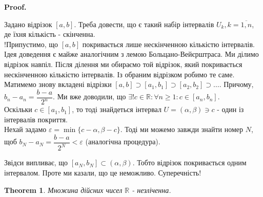 \documentclass[a4paper, 14pt]{article}
\makeatletter
\def\qed{$\blacksquare$}
\theoremstyle{theoremdd}
\newtheorem{theorem}{Theorem}[subsection]
\theoremstyle{theoremdd}
\theoremstyle{theoremdd}
\theoremstyle{theoremdd}
\theoremstyle{theoremdd}
\theoremstyle{theoremdd}
\theoremstyle{theoremdd}
\theoremstyle{theoremdd}
\renewenvironment{proof}[1][Proof.\\]{\par
\pushQED{\hfill \qed}%
\normalfont \topsep6\p@\@plus6\p@\relax
\trivlist
\item\relax
{\bfseries
#1\@addpunct{.}}\hspace\labelsep\ignorespaces
}{%
\popQED\endtrivlist\@endpefalse
}
\makeatother
\begin{document}
	\begin{proof}
	Задано відрізок $[a,b]$. Треба довести, що є такий набір інтервалів $U_k, k = \overline{1,n}$, де їхня кількість - скінченна.\\
	!Припустимо, що $[a,b]$ покривається лише нескінченною кількістю інтервалів. \\ 
	Ідея доведення є майже аналогічним з лемою Больцано-Вейєрштраса. Ми ділимо відрізок навпіл. Після ділення ми обираємо той відрізок, який покривається нескінченною кількістю інтервалів. Із обраним відрізком робимо те саме.\\
	Матимемо знову вкладені відрізки $[a,b] \supset [a_1,b_1] \supset [a_2,b_2] \supset \dots$. Причому, $b_n - a_n = \dfrac{b-a}{2^n}$. Ми вже доводили, що $\exists! c \in \mathbb{R}: \forall n \geq 1: c \in [a_n,b_n]$.\\
	Оскільки $c \in [a_1,b_1]$, то тоді знайдеться інтервал $U = (\alpha,\beta) \ni c$ - один із інтервалів покриття.\\
	Нехай задамо $\varepsilon = \min \{ c-\alpha, \beta-c \}$. Тоді ми можемо завжди знайти номер $N$, щоб $b_N - a_N = \dfrac{b-a}{2^N} < \varepsilon$ (аналогічна процедура).
	\begin{figure}[H]
	\centering
	\end{figure}
	Звідси випливає, що $[a_N,b_N] \subset (\alpha, \beta)$. Тобто відрізок покривається одним інтервалом. Проте ми казали, що це неможливо. Суперечність!
	\end{proof}
		
	\begin{theorem}
	Множина дійсних чисел $\mathbb{R}$ - незліченна.
	\end{theorem}
	
\end{document}
